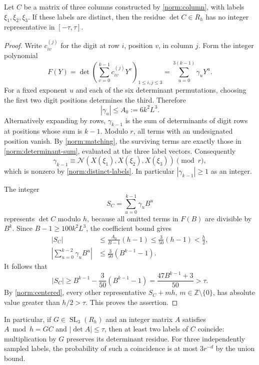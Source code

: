\begin{lemma}\label{norm:obstruction}
Let $C$ be a matrix of three columns constructed by
\eqref{norm:column}, with labels $\xi_1,\xi_2,\xi_3$.
If these labels are distinct, then the residue $\det C\in R_h$ has no
integer representative in $[-\tau,\tau]$.
\end{lemma}

\begin{proof}
Write $c_{iv}^{(j)}$ for the digit at row $i$, position $v$, in column
$j$.  Form the integer polynomial
\[
 F(Y)=\det\left(\sum_{v=0}^{k-1}c_{iv}^{(j)}Y^v\right)_{1\le i,j\le3}
      =\sum_{u=0}^{3(k-1)}\gamma_uY^u.
\]
For a fixed exponent $u$ and each of the six determinant permutations,
choosing the first two digit positions determines the third.  Therefore
\begin{equation}\label{norm:coefficient-bound}
 |\gamma_u|\le A_0:=6k^2L^3.
\end{equation}
Alternatively expanding by rows, $\gamma_{k-1}$ is the sum of
determinants of digit rows at positions whose sum is $k-1$.
Modulo $r$, all terms with an undesignated position vanish.
By \eqref{norm:matching}, the surviving terms are exactly those in
\eqref{norm:determinant-sum}, evaluated at the three label vectors.
Consequently
\[
 \gamma_{k-1}\equiv
 \mathcal N(X(\xi_1),X(\xi_2),X(\xi_3))\pmod r,
\]
which is nonzero by \eqref{norm:distinct-labels}.
In particular $|\gamma_{k-1}|\ge1$ as an integer.

The integer
\[
 S_C=\sum_{u=0}^{k-1}\gamma_uB^u
\]
represents $\det C$ modulo $h$, because all omitted terms in $F(B)$
are divisible by $B^k$.
Since $B-1\ge100k^2L^3$, the coefficient bound gives
\begin{align}
 |S_C|&\le\frac{A_0}{B-1}(h-1)
           \le\frac3{50}(h-1)<\frac h2,
            \label{norm:centered}\\
 \left|\sum_{u=0}^{k-2}\gamma_uB^u\right|
       &\le\frac3{50}(B^{k-1}-1).
            \label{norm:lower-carry}
\end{align}
It follows that
\[
 |S_C|\ge B^{k-1}-\frac3{50}(B^{k-1}-1)
         =\frac{47B^{k-1}+3}{50}>\tau.
\]
By \eqref{norm:centered}, every other representative $S_C+mh$,
$m\in\mathbb Z\setminus\{0\}$, has absolute value greater than
$h/2>\tau$.  This proves the assertion.
\end{proof}

In particular, if $G\in\operatorname{SL}_3(R_h)$ and an integer matrix
$A$ satisfies $A\bmod h=GC$ and $|\det A|\le\tau$, then at least two
labels of $C$ coincide: multiplication by $G$ preserves its determinant
residue.  For three independently sampled labels, the probability of
such a coincidence is at most $3r^{-d}$ by the union bound.
